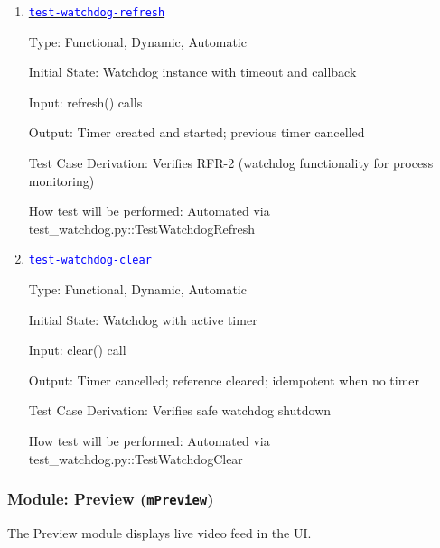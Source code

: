 \documentclass[12pt, titlepage]{article}
\newcommand{\mref}[1]{\texttt{#1}}
\newcommand{\tid}[1]{\hyperlink{tid:#1}{\textcolor{blue}{\texttt{#1}}}}
\begin{document}
\begin{enumerate}

  \item{\tid{test-watchdog-refresh}\\}

        Type: Functional, Dynamic, Automatic

        Initial State: Watchdog instance with timeout and callback

        Input: refresh() calls

        Output: Timer created and started; previous timer cancelled

        Test Case Derivation: Verifies RFR-2 (watchdog functionality for process
        monitoring)

        How test will be performed: Automated via
        test\_watchdog.py::TestWatchdogRefresh

  \item{\tid{test-watchdog-clear}\\}

        Type: Functional, Dynamic, Automatic

        Initial State: Watchdog with active timer

        Input: clear() call

        Output: Timer cancelled; reference cleared; idempotent when no timer

        Test Case Derivation: Verifies safe watchdog shutdown

        How test will be performed: Automated via test\_watchdog.py::TestWatchdogClear

\end{enumerate}

\subsubsection{Module: Preview (\mref{mPreview})}

The Preview module displays live video feed in the UI.
\end{document}

